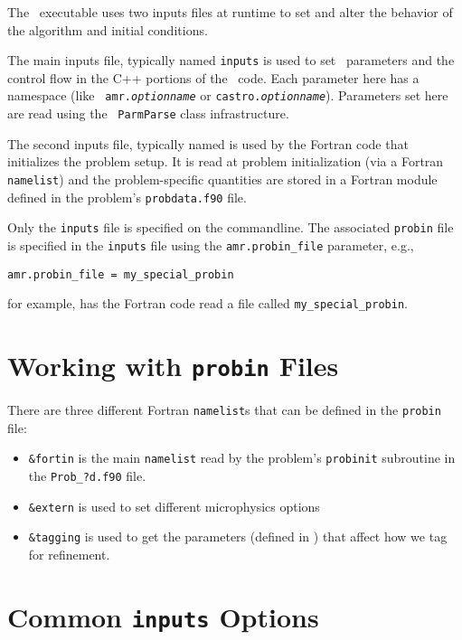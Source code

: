 The \castro\ executable uses two inputs files at runtime to set and alter the
behavior of the algorithm and initial conditions.

The main inputs file, typically named {\tt inputs} is used to
set \boxlib\ parameters and the control flow in the C++ portions of
the \castro\ code.  Each parameter here has a namespace (like {\tt
amr.{\em optionname}} or {\tt castro.{\em optionname}}).  Parameters
set here are read using the \boxlib\ {\tt ParmParse} class
infrastructure.

The second inputs file, typically named  is used by
the Fortran code that initializes the problem setup.  It is read at
problem initialization (via a Fortran {\tt namelist}) and the
problem-specific quantities are stored in a Fortran module
 defined in the problem's {\tt probdata.f90}
file.

Only the {\tt inputs} file is specified on the commandline.  The
associated {\tt probin} file is specified in the {\tt inputs} file
using the {\tt amr.probin\_file} parameter, e.g.,
\begin{lstlisting}
amr.probin_file = my_special_probin
\end{lstlisting}
for example, has the Fortran code read a file called {\tt my\_special\_probin}.

\section{Working with {\tt probin} Files}

There are three different Fortran {\tt namelist}s that can be defined in the
{\tt probin} file:
\begin{itemize}
\item {\tt \&fortin} is the main {\tt namelist} read by the problem's {\tt probinit}
subroutine in the {\tt Prob\_?d.f90} file.

\item {\tt \&extern} is used to set different microphysics options

\item {\tt \&tagging} is used to get the parameters (defined in )
that affect how we tag for refinement.
\end{itemize}

\section{Common {\tt inputs} Options}

